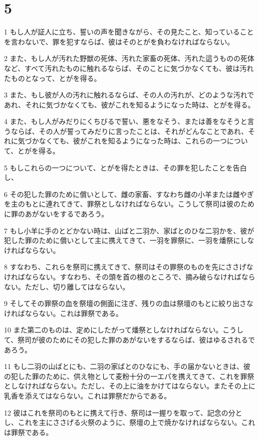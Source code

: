 \chapter{5}

\par 1 もし人が証人に立ち、誓いの声を聞きながら、その見たこと、知っていることを言わないで、罪を犯すならば、彼はそのとがを負わなければならない。
\par 2 また、もし人が汚れた野獣の死体、汚れた家畜の死体、汚れた這うものの死体など、すべて汚れたものに触れるならば、そのことに気づかなくても、彼は汚れたものとなって、とがを得る。
\par 3 また、もし彼が人の汚れに触れるならば、その人の汚れが、どのような汚れであれ、それに気づかなくても、彼がこれを知るようになった時は、とがを得る。
\par 4 また、もし人がみだりにくちびるで誓い、悪をなそう、または善をなそうと言うならば、その人が誓ってみだりに言ったことは、それがどんなことであれ、それに気づかなくても、彼がこれを知るようになった時は、これらの一つについて、とがを得る。
\par 5 もしこれらの一つについて、とがを得たときは、その罪を犯したことを告白し、
\par 6 その犯した罪のために償いとして、雌の家畜、すなわち雌の小羊または雌やぎを主のもとに連れてきて、罪祭としなければならない。こうして祭司は彼のために罪のあがないをするであろう。
\par 7 もし小羊に手のとどかない時は、山ばと二羽か、家ばとのひな二羽かを、彼が犯した罪のために償いとして主に携えてきて、一羽を罪祭に、一羽を燔祭にしなければならない。
\par 8 すなわち、これらを祭司に携えてきて、祭司はその罪祭のものを先にささげなければならない。すなわち、その頭を首の根のところで、摘み破らなければならない。ただし、切り離してはならない。
\par 9 そしてその罪祭の血を祭壇の側面に注ぎ、残りの血は祭壇のもとに絞り出さなければならない。これは罪祭である。
\par 10 また第二のものは、定めにしたがって燔祭としなければならない。こうして、祭司が彼のためにその犯した罪のあがないをするならば、彼はゆるされるであろう。
\par 11 もし二羽の山ばとにも、二羽の家ばとのひなにも、手の届かないときは、彼の犯した罪のために、供え物として麦粉十分の一エパを携えてきて、これを罪祭としなければならない。ただし、その上に油をかけてはならない。またその上に乳香を添えてはならない。これは罪祭だからである。
\par 12 彼はこれを祭司のもとに携えて行き、祭司は一握りを取って、記念の分とし、これを主にささげる火祭のように、祭壇の上で焼かなければならない。これは罪祭である。
